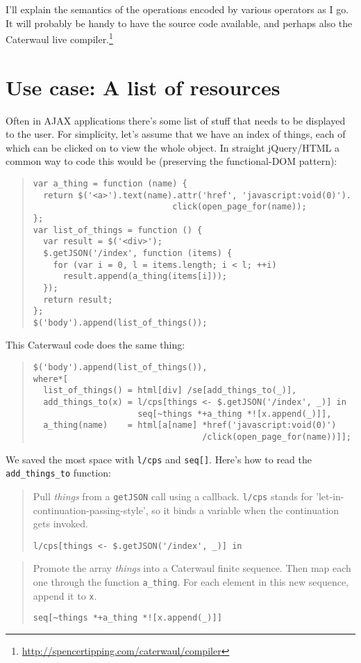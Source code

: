 \documentclass{report}
\begin{document}
    I'll explain the semantics of the operations encoded by various operators as I go. It will probably be handy to have the source code available, and perhaps also the Caterwaul live
    compiler.\footnote{\url{http://spencertipping.com/caterwaul/compiler}}

\section{Use case: A list of resources}
    Often in AJAX applications there's some list of stuff that needs to be displayed to the user. For simplicity, let's assume that we have an index of things, each of which can be clicked on
    to view the whole object. In straight jQuery/HTML a common way to code this would be (preserving the functional-DOM pattern):

\begin{quote}
\begin{verbatim}
var a_thing = function (name) {
  return $('<a>').text(name).attr('href', 'javascript:void(0)').
                            click(open_page_for(name));
};
var list_of_things = function () {
  var result = $('<div>');
  $.getJSON('/index', function (items) {
    for (var i = 0, l = items.length; i < l; ++i)
      result.append(a_thing(items[i]));
  });
  return result;
};
$('body').append(list_of_things());
\end{verbatim}
\end{quote}

    \noindent This Caterwaul code does the same thing:

\begin{quote}
\begin{verbatim}
$('body').append(list_of_things()),
where*[
  list_of_things() = html[div] /se[add_things_to(_)],
  add_things_to(x) = l/cps[things <- $.getJSON('/index', _)] in
                     seq[~things *+a_thing *![x.append(_)]],
  a_thing(name)    = html[a[name] *href('javascript:void(0)')
                                  /click(open_page_for(name))]];
\end{verbatim}
\end{quote}

    \noindent We saved the most space with {\tt l/cps} and {\tt seq[]}. Here's how to read the \verb|add_things_to| function:

\begin{quote}
Pull {\it things} from a {\tt getJSON} call using a callback. {\tt l/cps} stands for 'let-in-continuation-passing-style', so it binds a variable when the continuation gets invoked.
\begin{verbatim}
l/cps[things <- $.getJSON('/index', _)] in
\end{verbatim}
\end{quote}

\begin{quote}
Promote the array {\it things} into a Caterwaul finite sequence. Then map each one through the function \verb|a_thing|. For each element in this new sequence, append it to {\tt x}.
\begin{verbatim}
seq[~things *+a_thing *![x.append(_)]]
\end{verbatim}
\end{quote}
\end{document}
